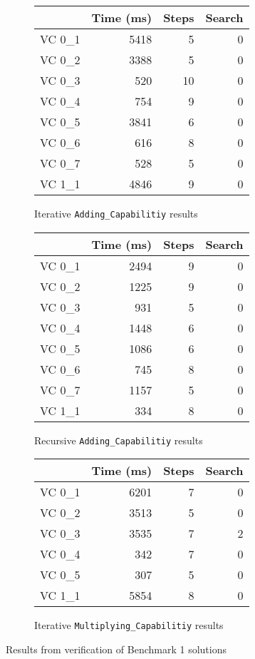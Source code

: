 \begin{figure}
	\centering
	\begin{subfigure}[b]{0.4\textwidth}
		\centering
		\begin{tabular}{lrrr}
			\toprule
				& Time (ms)	& Steps	& Search \\
			\midrule
			VC 0\_1	& 5418		& 5	& 0     \\
			VC 0\_2	& 3388		& 5	& 0     \\
			VC 0\_3	& 520		& 10	& 0     \\
			VC 0\_4	& 754		& 9	& 0     \\
			VC 0\_5	& 3841		& 6	& 0     \\
			VC 0\_6	& 616		& 8	& 0     \\
			VC 0\_7	& 528		& 5	& 0     \\
			VC 1\_1	& 4846		& 9	& 0     \\
			\bottomrule
		\end{tabular}
		\caption{Iterative \texttt{Adding\_Capabilitiy} results\label{fig:iterAddResults}}
	\end{subfigure}
	\qquad
	\begin{subfigure}[b]{0.4\textwidth}
		\centering
		\begin{tabular}{lrrr}
			\toprule
				& Time (ms)	& Steps	& Search \\
			\midrule
			VC 0\_1	& 2494		& 9	& 0     \\
			VC 0\_2	& 1225		& 9	& 0     \\
			VC 0\_3	& 931		& 5	& 0     \\
			VC 0\_4	& 1448		& 6	& 0     \\
			VC 0\_5	& 1086		& 6	& 0     \\
			VC 0\_6	& 745		& 8	& 0     \\
			VC 0\_7	& 1157		& 5	& 0     \\
			VC 1\_1	& 334		& 8	& 0     \\
			\bottomrule
		\end{tabular}
		\caption{Recursive \texttt{Adding\_Capabilitiy} results\label{fig:recAddResults}}
	\end{subfigure}

	\vspace{2em}
	\begin{subfigure}[b]{0.6\textwidth}
		\centering
		\begin{tabular}{lrrr}
			\toprule
				& Time (ms)	& Steps	& Search \\
			\midrule
			VC 0\_1	& 6201		& 7	& 0     \\
			VC 0\_2	& 3513		& 5	& 0     \\
			VC 0\_3	& 3535		& 7	& 2     \\
			VC 0\_4	& 342		& 7	& 0     \\
			VC 0\_5	& 307		& 5	& 0     \\
			VC 1\_1	& 5854		& 8	& 0     \\
			\bottomrule
		\end{tabular}
		\caption{Iterative \texttt{Multiplying\_Capabilitiy} results\label{fig:recAddResults}}
	\end{subfigure}
  \caption{Results from verification of Benchmark 1 solutions}
\end{figure}


